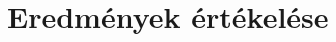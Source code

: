 \documentclass[../documentation.tex]{subfiles}
\begin{document}
\section{Eredmények értékelése}
\end{document}
